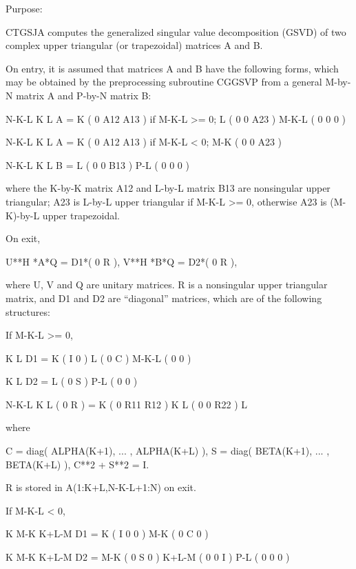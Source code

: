  \begin{DoxyParagraph}{Purpose\+: }
\begin{DoxyVerb} CTGSJA computes the generalized singular value decomposition (GSVD)
 of two complex upper triangular (or trapezoidal) matrices A and B.

 On entry, it is assumed that matrices A and B have the following
 forms, which may be obtained by the preprocessing subroutine CGGSVP
 from a general M-by-N matrix A and P-by-N matrix B:

              N-K-L  K    L
    A =    K ( 0    A12  A13 ) if M-K-L >= 0;
           L ( 0     0   A23 )
       M-K-L ( 0     0    0  )

            N-K-L  K    L
    A =  K ( 0    A12  A13 ) if M-K-L < 0;
       M-K ( 0     0   A23 )

            N-K-L  K    L
    B =  L ( 0     0   B13 )
       P-L ( 0     0    0  )

 where the K-by-K matrix A12 and L-by-L matrix B13 are nonsingular
 upper triangular; A23 is L-by-L upper triangular if M-K-L >= 0,
 otherwise A23 is (M-K)-by-L upper trapezoidal.

 On exit,

        U**H *A*Q = D1*( 0 R ),    V**H *B*Q = D2*( 0 R ),

 where U, V and Q are unitary matrices.
 R is a nonsingular upper triangular matrix, and D1
 and D2 are ``diagonal'' matrices, which are of the following
 structures:

 If M-K-L >= 0,

                     K  L
        D1 =     K ( I  0 )
                 L ( 0  C )
             M-K-L ( 0  0 )

                    K  L
        D2 = L   ( 0  S )
             P-L ( 0  0 )

                N-K-L  K    L
   ( 0 R ) = K (  0   R11  R12 ) K
             L (  0    0   R22 ) L

 where

   C = diag( ALPHA(K+1), ... , ALPHA(K+L) ),
   S = diag( BETA(K+1),  ... , BETA(K+L) ),
   C**2 + S**2 = I.

   R is stored in A(1:K+L,N-K-L+1:N) on exit.

 If M-K-L < 0,

                K M-K K+L-M
     D1 =   K ( I  0    0   )
          M-K ( 0  C    0   )

                  K M-K K+L-M
     D2 =   M-K ( 0  S    0   )
          K+L-M ( 0  0    I   )
            P-L ( 0  0    0   )


\end{DoxyVerb}
\end{DoxyParagraph}
